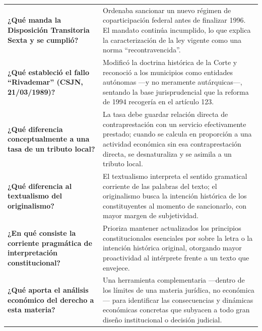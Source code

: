 \documentclass[12pt,oneside]{book}
\begin{document}
\begin{longtable}{
    >{\raggedright\arraybackslash}p{}
    >{\raggedright\arraybackslash}p{}
}
\textbf{¿Qué manda la Disposición Transitoria Sexta y se cumplió?} &
Ordenaba sancionar un nuevo régimen de coparticipación federal antes de finalizar 1996. El mandato continúa incumplido, lo que explica la caracterización de la ley vigente como una norma ``recontravencida''. \\

\textbf{¿Qué estableció el fallo ``Rivademar'' (CSJN, 21/03/1989)?} &
Modificó la doctrina histórica de la Corte y reconoció a los municipios como entidades autónomas ---y no meramente autárquicas---, sentando la base jurisprudencial que la reforma de 1994 recogería en el artículo 123. \\

\textbf{¿Qué diferencia conceptualmente a una tasa de un tributo local?} &
La tasa debe guardar relación directa de contraprestación con un servicio efectivamente prestado; cuando se calcula en proporción a una actividad económica sin esa contraprestación directa, se desnaturaliza y se asimila a un tributo local. \\

\textbf{¿Qué diferencia al textualismo del originalismo?} &
El textualismo interpreta el sentido gramatical corriente de las palabras del texto; el originalismo busca la intención histórica de los constituyentes al momento de sancionarlo, con mayor margen de subjetividad. \\

\textbf{¿En qué consiste la corriente pragmática de interpretación constitucional?} &
Prioriza mantener actualizados los principios constitucionales esenciales por sobre la letra o la intención histórica original, otorgando mayor proactividad al intérprete frente a un texto que envejece. \\

\textbf{¿Qué aporta el análisis económico del derecho a esta materia?} &
Una herramienta complementaria ---dentro de los límites de una materia jurídica, no económica--- para identificar las consecuencias y dinámicas económicas concretas que subyacen a todo gran diseño institucional o decisión judicial. \\


\end{longtable}
\end{document}
